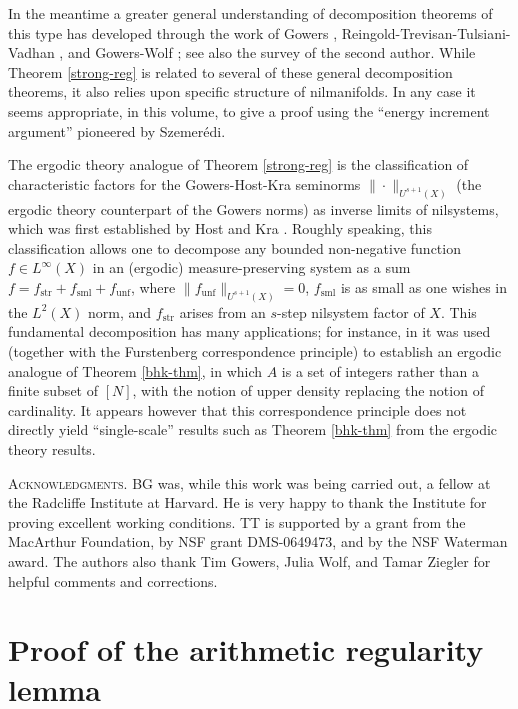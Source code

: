 \documentclass[11pt,reqno]{amsart}
\numberwithin{equation}{section}
\theoremstyle{plain}
\theoremstyle{definition}
\newcommand\1{{\bf 1}}
\newcommand\2{{\bf 2}}
\newcommand\str{{\operatorname{str}}}
\newcommand\sml{{\operatorname{sml}}}
\newcommand\unf{{\operatorname{unf}}}
\begin{document}
In the meantime a greater general understanding of decomposition theorems of this type has developed through the work of Gowers \cite{gowers-regularity}, Reingold-Trevisan-Tulsiani-Vadhan \cite{rttv}, and Gowers-Wolf \cite{gowers-wolf-1,gowers-wolf-2,gowers-wolf-3}; see also the survey \cite{tao-focs} of the second author. While Theorem \ref{strong-reg} is related to several of these general decomposition theorems, it also relies upon specific structure of nilmanifolds. In any case it seems appropriate, in this volume, to give a proof using the ``energy increment argument'' pioneered by Szemer\'edi.

The ergodic theory analogue of Theorem \ref{strong-reg} is the classification of characteristic factors for the Gowers-Host-Kra seminorms $\| \cdot \|_{U^{s+1}(X)}$ (the ergodic theory counterpart of the Gowers norms) as inverse limits of nilsystems, which was first established by Host and Kra \cite{host-kra}.  Roughly speaking, this classification allows one to decompose any bounded non-negative function $f \in L^\infty(X)$ in an (ergodic) measure-preserving system as a sum $f = f_\str + f_\sml + f_\unf$, where $\|f_\unf\|_{U^{s+1}(X)}=0$, $f_\sml$ is as small as one wishes in the $L^2(X)$ norm, and $f_\str$ arises from an $s$-step nilsystem factor of $X$.  This fundamental decomposition has many applications; for instance, in \cite{bergelson-host-kra} it was used (together with the Furstenberg correspondence principle) to establish an ergodic analogue of Theorem \ref{bhk-thm}, in which $A$ is a set of integers rather than a finite subset of $[N]$, with the notion of upper density replacing the notion of cardinality.  It appears however that this correspondence principle does not directly yield ``single-scale'' results such as Theorem \ref{bhk-thm} from the ergodic theory results.

\textsc{Acknowledgments.}  BG was, while this work was being carried out, a fellow at the Radcliffe Institute at Harvard. He is very happy to thank the Institute for proving excellent working conditions.
TT is supported by a grant from the MacArthur Foundation, by NSF grant DMS-0649473, and by the NSF Waterman award.  The authors also thank Tim Gowers, Julia Wolf, and Tamar Ziegler for helpful comments and corrections.


\section{Proof of the arithmetic regularity lemma}\label{regularity-sec}
\end{document}
